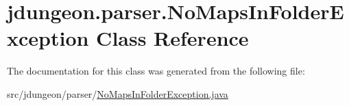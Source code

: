 \hypertarget{classjdungeon_1_1parser_1_1_no_maps_in_folder_exception}{
\section{jdungeon.parser.NoMapsInFolderException Class Reference}
\label{classjdungeon_1_1parser_1_1_no_maps_in_folder_exception}
}


The documentation for this class was generated from the following file:\begin{DoxyCompactItemize}
\item 
src/jdungeon/parser/\hyperlink{_no_maps_in_folder_exception_8java}{NoMapsInFolderException.java}\end{DoxyCompactItemize}
